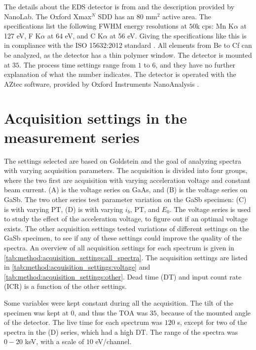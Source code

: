 The details about the EDS detector is from \cite{xmaxn_datasheet} and the description provided by NanoLab.
The Oxford Xmax$^N$ SDD has an $80$ mm$^2$ active area. %
The specifications list the following FWHM energy resolutions at $50$k cps: Mn K$\alpha$ at 127 eV, F  K$\alpha$ at 64 eV, and C  K$\alpha$ at 56 eV.
Giving the specifications like this is in compliance with the ISO 15632:2012 standard \cite{iso_qc_15632}.
All elements from Be to Cf can be analyzed, as the detector has a thin polymer window.
The detector is mounted at $35$\textdegree.
The process time settings range from $1$ to $6$, and they have no further explanation of what the number indicates.
The detector is operated with the AZtec software, provided by Oxford Instruments NanoAnalysis \cite{aztec_manual}.



\section{Acquisition settings in the measurement series}
\label{method:acquisition_settings}

The settings selected are based on Goldstein \cite{goldstein_scanning_2018} and the goal of analyzing spectra with varying acquisition parameters.
The acquisition is divided into four groups, where the two first are acquisition with varying acceleration voltage and constant beam current.
(A) is the voltage series on GaAs, and (B) is the voltage series on GaSb.
The two other series test parameter variation on the GaSb specimen: (C) is with varying PT, (D) is with varying $i_b$, PT, and $E_0$.
The voltage series is used to study the effect of the acceleration voltage, to figure out if an optimal voltage exists.
The other acquisition settings tested variations of different settings on the GaSb specimen, to see if any of these settings could improve the quality of the spectra.
An overview of all acquisition settings for each spectrum is given in \cref{tab:method:acquisition_settings:all_spectra}.
The acquisition settings are listed in \cref{tab:method:acquisition_settings:voltage} and \cref{tab:method:acquisition_settings:other}.
Dead time (DT) and input count rate (ICR) is a function of the other settings.


Some variables were kept constant during all the acquisition.
The tilt of the specimen was kept at $0$\textdegree, and thus the TOA was $35$\textdegree, because of the mounted angle of the detector.
The live time for each spectrum was $120$ s, except for two of the spectra in the (D) series, which had a high DT.
The range of the spectra was $0-20$ keV, with a scale of $10$ eV/channel.

